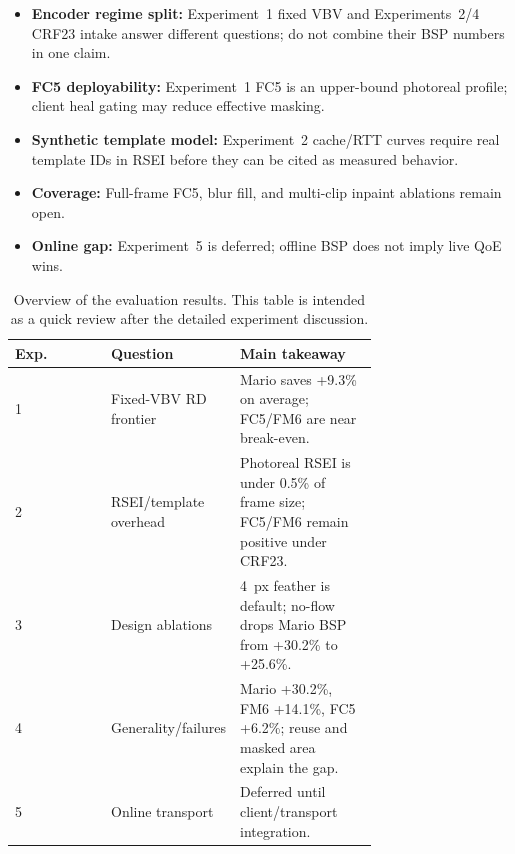 \begin{itemize}
  \item \textbf{Encoder regime split:} Experiment~1 fixed VBV and Experiments~2/4 CRF23 intake answer different questions; do not combine their BSP numbers in one claim.
  \item \textbf{FC5 deployability:} Experiment~1 FC5 is an upper-bound photoreal profile; client heal gating may reduce effective masking.
  \item \textbf{Synthetic template model:} Experiment~2 cache/RTT curves require real template IDs in RSEI before they can be cited as measured behavior.
  \item \textbf{Coverage:} Full-frame FC5, blur fill, and multi-clip inpaint ablations remain open.
  \item \textbf{Online gap:} Experiment~5 is deferred; offline BSP does not imply live QoE wins.
\end{itemize}

\begin{table}[t]
  \centering
  \small
  \caption{Overview of the evaluation results. This table is intended as a quick review after the detailed experiment discussion.}
  \label{tab:ExperimentOverview}
  \setlength{\tabcolsep}{4pt}
  \begin{tabular}{@{}lp{0.34\linewidth}p{0.38\linewidth}@{}}
    \toprule
    \textbf{Exp.} & \textbf{Question} & \textbf{Main takeaway} \\
    \midrule
    1 & Fixed-VBV RD frontier & Mario saves +9.3\% on average; FC5/FM6 are near break-even. \\
    2 & RSEI/template overhead & Photoreal RSEI is under 0.5\% of frame size; FC5/FM6 remain positive under CRF23. \\
    3 & Design ablations & 4~px feather is default; no-flow drops Mario BSP from +30.2\% to +25.6\%. \\
    4 & Generality/failures & Mario +30.2\%, FM6 +14.1\%, FC5 +6.2\%; reuse and masked area explain the gap. \\
    5 & Online transport & Deferred until client/transport integration. \\
    \bottomrule
  \end{tabular}
\end{table}
